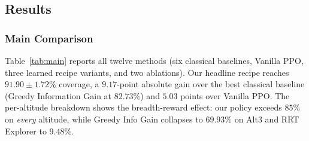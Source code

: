 \documentclass[runningheads]{llncs}
\begin{document}
\subsection{Results}\label{sec:results}

\subsubsection{Main Comparison}
Table~\ref{tab:main} reports all twelve methods (six classical baselines, Vanilla PPO, three learned recipe variants, and two ablations). Our headline recipe reaches $91.90\!\pm\!1.72\%$ coverage, a $9.17$-point absolute gain over the best classical baseline (Greedy Information Gain at $82.73\%$) and $5.03$ points over Vanilla PPO. The per-altitude breakdown shows the breadth-reward effect: our policy exceeds $85\%$ on \emph{every} altitude, while Greedy Info Gain collapses to $69.93\%$ on Alt3 and RRT Explorer to $9.48\%$.
\end{document}
